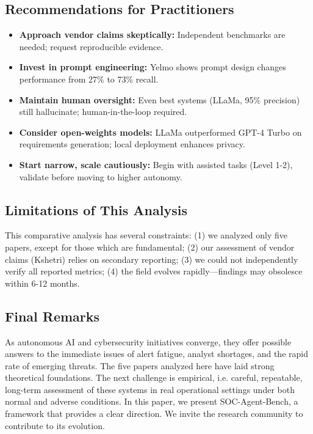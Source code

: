 \documentclass[journal]{IEEEtran}
\begin{document}
\subsection{Recommendations for Practitioners}
\begin{itemize}
    \item \textbf{Approach vendor claims skeptically:} Independent benchmarks are needed; request reproducible evidence.
    \item \textbf{Invest in prompt engineering:} Yelmo shows prompt design changes performance from 27\% to 73\% recall.
    \item \textbf{Maintain human oversight:} Even best systems (LLaMa, 95\% precision) still hallucinate; human-in-the-loop required.
    \item \textbf{Consider open-weights models:} LLaMa outperformed GPT-4 Turbo on requirements generation; local deployment enhances privacy.
    \item \textbf{Start narrow, scale cautiously:} Begin with assisted tasks (Level 1-2), validate before moving to higher autonomy.
\end{itemize}

\subsection{Limitations of This Analysis}
This comparative analysis has several constraints: (1) we analyzed only five papers, except for those which are fundamental; (2) our assessment of vendor claims (Kshetri) relies on secondary reporting; (3) we could not independently verify all reported metrics; (4) the field evolves rapidly---findings may obsolesce within 6-12 months.

\subsection{Final Remarks}
As autonomous AI and cybersecurity initiatives converge, they offer possible answers to the immediate issues of alert fatigue, analyst shortages, and the rapid rate of emerging threats. The five papers analyzed here have laid strong theoretical foundations. The next challenge is empirical, i.e. careful, repeatable, long-term assessment of these systems in real operational settings under both normal and adverse conditions. In this paper, we present SOC-Agent-Bench, a framework that provides a clear direction. We invite the research community to contribute to its evolution.

\appendices
\end{document}
